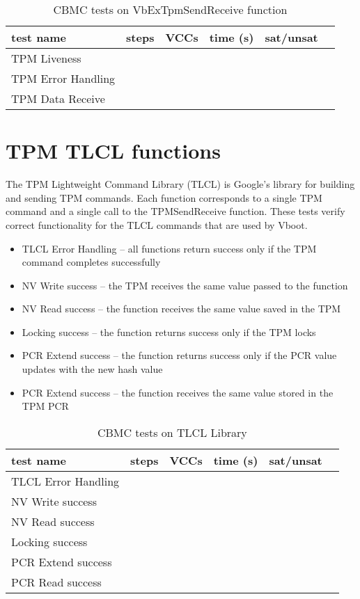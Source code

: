 \begin{table}[!htbp]
    \centering
    \caption{CBMC tests on VbExTpmSendReceive function}\label{tpmSR_results}
    \begin{tabular}{llllll}
        \toprule
        test name & steps & VCCs & time (s) & sat/unsat  \\ \bottomrule
        TPM Liveness & & & & \\
        TPM Error Handling &  &  & & \\
        TPM Data Receive &  &  & & \\\bottomrule
    \end{tabular}
\end{table}

\section{TPM TLCL functions}

The TPM Lightweight Command Library (TLCL) is Google's library for building and sending TPM commands.
Each function corresponds to a single TPM command and a single call to the TPMSendReceive function.
These tests verify correct functionality for the TLCL commands that are used by Vboot. 

\begin{itemize}
   \item TLCL Error Handling --  all functions return success only if the TPM command completes successfully
   \item NV Write success -- the TPM receives the same value passed to the function
   \item NV Read success --  the function receives the same value saved in the TPM
   \item Locking success --  the function returns success only if the TPM locks
   \item PCR Extend success --  the function returns success only if the PCR value updates with the new hash value
   \item PCR Extend success --  the function receives the same value stored in the TPM PCR

\end{itemize}

\begin{table}[!htbp]
    \centering
    \caption{CBMC tests on TLCL Library}\label{TLCL_results}
    \begin{tabular}{llllll}
        \toprule
        test name & steps & VCCs & time (s) & sat/unsat  \\ \bottomrule
        TLCL Error Handling& & & & \\
        NV Write success&  &  & & \\
        NV Read success&  &  & & \\
        Locking success&  &  & & \\
        PCR Extend success&  &  & & \\
        PCR Read success&  &  & & \\\bottomrule
    \end{tabular}
\end{table}

